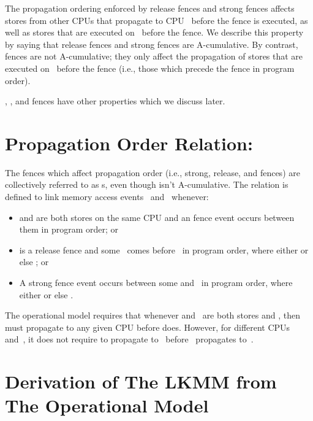 The propagation ordering enforced by release fences and strong fences
affects stores from other CPUs that propagate to CPU~ before the
fence is executed, as well as stores that are executed on~ before the
fence.
We describe this property by saying that release fences and
strong fences are A-cumulative.
By contrast,  fences are not A-cumulative; they only
affect the propagation of stores that are executed on~ before
the fence (i.e., those which precede the fence in program order).

, , and 
fences have other properties which we discuss later.


\section{Propagation Order Relation: }
\label{sec:docs:explanation:Propagation Order Releation: cumul-fence}

The fences which affect propagation order (i.e., strong, release, and
 fences) are collectively referred to as s, even
though  isn't A-cumulative.
The  relation is defined to link memory access events~
and~ whenever:

\begin{itemize}
\item	{} and  are both stores on the same CPU and an  fence
	event occurs between them in program order; or

\item	{} is a release fence and some ~comes before~ in program order,
	where either  or else ; or

\item	A strong fence event occurs between some  and~ in program
	order, where either  or else .
\end{itemize}

The operational model requires that whenever  and~ are both stores
and , then  must propagate to any given CPU
before  does.
However, for different CPUs~ and~, it does not
require  to propagate to~ before~ propagates to~.


\section{Derivation of The LKMM from The Operational Model}
\label{sec:docs:explanation:Derivation of The LKMM from The Operational Model}

